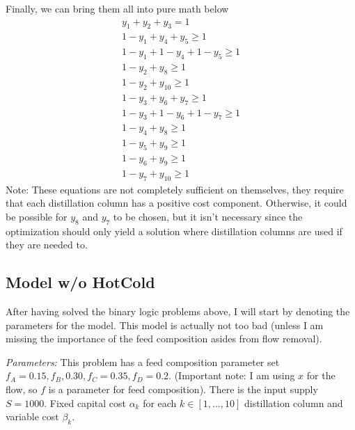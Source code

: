 \documentclass[11pt]{article}
\begin{document}
Finally, we can bring them all into pure math below
\begin{align*}
  y_1 + y_2 + y_3 = 1 \\
  1-y_1 + y_4 + y_5 \geq 1 \\
  1-y_1 + 1-y_4 + 1-y_5 \geq 1 \\
  1-y_2 + y_8 \geq 1 \\
  1-y_2 + y_{10} \geq 1 \\
  1-y_3 + y_6 + y_7 \geq 1 \\
  1-y_3 + 1 - y_6 + 1- y_7 \geq 1 \\
  1-y_4 + y_8 \geq 1 \\
  1-y_5+ y_9 \geq 1 \\
  1-y_6 + y_9 \geq 1 \\
  1-y_7 + y_{10} \geq 1
\end{align*}
Note: These equations are not completely sufficient on themselves, they require that each distillation column has a positive cost component.
Otherwise, it could be possible for $y_8$ and $y_7$ to be chosen, but it isn't necessary since the optimization should only yield a solution where distillation columns are used if they are needed to.
\subsection{Model w/o HotCold}
After having solved the binary logic problems above, I will start by denoting the parameters for the model.
This model is actually not too bad (unless I am missing the importance of the feed composition asides from flow removal).

\textit{Parameters:}
This problem has a feed composition parameter set $f_A=0.15,f_B,0.30,f_C=0.35,f_D=0.2$. 
(Important note: I am using $x$ for the flow, so $f$ is a parameter for feed composition).
There is the input supply $S=1000$.
Fixed capital cost $\alpha_k$ for each $k \in [1,\dots,10]$ distillation column and variable cost $\beta_k$.
\end{document}
